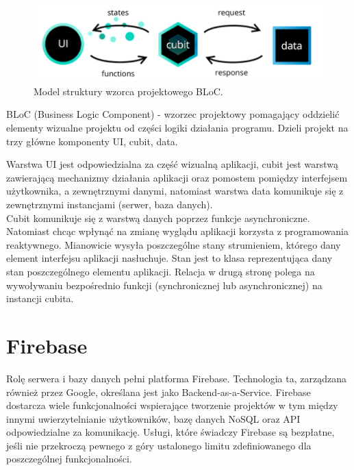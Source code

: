 \begin{figure}[h!]
	\begin{center}
		\includegraphics[width=1\textwidth]{img/cubit.png}
	\end{center}
	\caption{{\color{dgray}Model struktury wzorca projektowego BLoC.}} 
	\label{struktura_BLoC}
\end{figure}  

BLoC (Business Logic Component) - wzorzec projektowy pomagający oddzielić elementy wizualne projektu od części logiki działania programu. Dzieli projekt na trzy główne komponenty UI, cubit, data.

Warstwa UI jest odpowiedzialna za część wizualną aplikacji, cubit jest warstwą zawierającą mechanizmy działania aplikacji oraz pomostem pomiędzy interfejsem użytkownika, a zewnętrznymi danymi, natomiast warstwa data komunikuje się z zewnętrznymi instancjami (serwer, baza danych).\\

Cubit komunikuje się z warstwą danych poprzez funkcje asynchroniczne. Natomiast chcąc wpłynąć na zmianę wyglądu aplikacji korzysta z programowania reaktywnego. Mianowicie wysyła poszczególne stany strumieniem, którego dany element interfejsu aplikacji nasłuchuje. Stan jest to klasa reprezentująca dany stan poszczególnego elementu aplikacji. Relacja w drugą stronę polega na wywoływaniu bezpośrednio funkcji (synchronicznej lub asynchronicznej) na instancji cubita.

\section{Firebase}

Rolę serwera i bazy danych pełni platforma Firebase. Technologia ta, zarządzana również przez Google, określana jest jako Backend-as-a-Service. Firebase dostarcza wiele funkcjonalności wspierające tworzenie projektów w tym między innymi uwierzytelnianie użytkowników, bazę danych NoSQL oraz API odpowiedzialne za komunikację. Usługi, które świadczy Firebase są bezpłatne, jeśli nie przekroczą pewnego z góry ustalonego limitu zdefiniowanego dla poszczególnej funkcjonalności. 

